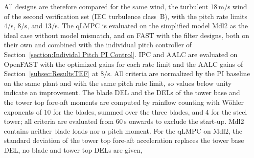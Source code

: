 All designs are therefore compared for the same wind, the turbulent 18\,m/s wind of the
second verification set (IEC turbulence class~B), with the pitch rate limits 4\textdegree/s,
8\textdegree/s, and 13\textdegree/s. The qLMPC is evaluated on the simplified model Mdl2 as the
ideal case without model mismatch, and on FAST with the filter designs, both on their own
and combined with the individual pitch controller of Section~\ref{section:Individal Pitch PI Control}.
IPC and AALC are evaluated on OpenFAST with the optimized gains for each rate limit and the
AALC gains of Section~\ref{subsec:ResultsTEF} at 8\textdegree/s. All criteria are normalized by the
PI baseline on the same plant and with the same pitch rate limit, so values below unity
indicate an improvement. The blade DEL and the DELs of the tower base and the tower top fore-aft moments are computed by
rainflow counting with W\"ohler exponents of 10 for the blades, summed over the three blades, and
4 for the steel tower; all criteria are evaluated from 60\,s onwards to exclude the start-up. Mdl2 contains neither blade loads nor a pitch moment. For the qLMPC on Mdl2, the standard deviation of the
tower top fore-aft acceleration replaces the tower base DEL, no blade and tower top DELs are given, 

